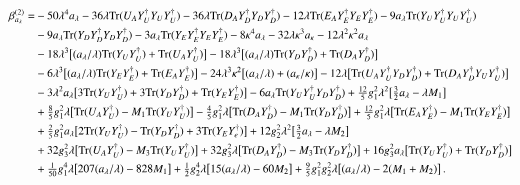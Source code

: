 \documentclass[final,3p,times]{elsarticle}
\newcommand{\lamsq}{\lambda^2}
\newcommand{\kapsq}{\kappa^2}
\newcommand{\tr}{\mathrm{Tr}}
\newcommand{\Alam}{a_\lambda/\lambda}
\newcommand{\Akap}{a_\kappa/\kappa}
\begin{document}
\begin{align}
\beta_{a_\lambda}^{(2)} =&-50\lambda^4 a_\lambda 
- 36\lambda\tr(U_A Y_U^\dagger Y_U Y_U^\dagger) 
- 36\lambda\tr(D_A Y_D^\dagger Y_D Y_D^\dagger)
- 12\lambda\tr(E_A Y_E^\dagger Y_E Y_E^\dagger) 
- 9a_\lambda\tr( Y_U Y_U^\dagger Y_U Y_U^\dagger) \notag \\
%
&- 9a_\lambda\tr( Y_D Y_D^\dagger Y_D Y_D^\dagger) 
- 3a_\lambda\tr( Y_E Y_E^\dagger Y_E Y_E^\dagger) - 8\kappa^4 a_\lambda 
- 32\lambda\kappa^3 a_\kappa - 12\lamsq\kapsq a_\lambda \notag \\
%
&-18\lambda^3\big[ (\Alam)\tr( Y_U Y_U^\dagger) + \tr(U_A Y_U^\dagger)\big] 
- 18\lambda^3\big[(\Alam)\tr( Y_D Y_D^\dagger) + \tr(D_A Y_D^\dagger)\big] \notag \\
%
&-6\lambda^3\big[(\Alam)\tr( Y_E Y_E^\dagger) + \tr(E_A Y_E^\dagger)\big] 
-24\lambda^3\kapsq\big[ (\Alam) + (\Akap)\big]
-12\lambda\big[ \tr(U_A Y_U^\dagger Y_D Y_D^\dagger) 
+ \tr(D_A Y_D^\dagger Y_U Y_U^\dagger) \big] \notag \\
%
&-3\lamsq a_\lambda\big[ 3\tr( Y_U Y_U^\dagger) + 3\tr( Y_D Y_D^\dagger) 
+ \tr( Y_E Y_E^\dagger) \big] -6a_\lambda\tr( Y_U Y_U^\dagger Y_D Y_D^\dagger) 
+ \tfrac{12}{5}g_1^2\lamsq\big[ \tfrac{3}{2}a_\lambda - \lambda M_1\big] \notag \\
%
&+\tfrac{8}{5}g_1^2\lambda\big[ \tr(U_A Y_U^\dagger) - M_1\tr( Y_U Y_U^\dagger) \big]
-\tfrac{4}{5}g_1^2\lambda\big[ \tr(D_A Y_D^\dagger) - M_1\tr( Y_D Y_D^\dagger)\big] 
+\tfrac{12}{5}g_1^2\lambda\big[\tr(E_A Y_E^\dagger) - M_1\tr( Y_E Y_E^\dagger)\big] 
\notag \\
%
&+\tfrac{2}{5}g_1^2 a_\lambda\big[ 2\tr( Y_U Y_U^\dagger) - \tr( Y_D Y_D^\dagger) 
+ 3\tr( Y_E Y_e^\dagger) \big] + 12g_2^2\lamsq\big[ \tfrac{3}{2}a_\lambda 
- \lambda M_2\big] \notag \\
%
&+32g_3^2\lambda\big[ \tr(U_A Y_U^\dagger) - M_3\tr( Y_U Y_U^\dagger) \big]
+32g_3^2\lambda\big[\tr(D_A Y_D^\dagger) - M_3\tr( Y_D Y_D^\dagger) \big] 
+ 16g_3^2 a_\lambda\big[ \tr( Y_U Y_U^\dagger) + \tr( Y_D Y_D^\dagger) \big] \notag \\
%
&+ \tfrac{1}{50}g_1^4\lambda\big[ 207(\Alam) - 828M_1\big] 
+ \tfrac{1}{2}g_2^4\lambda\big[ 15(\Alam) - 60M_2\big]
+\tfrac{9}{5}g_1^2 g_2^2\lambda\big[ (\Alam) - 2(M_1 + M_2)\big] \,.
\end{align}
\end{document}
